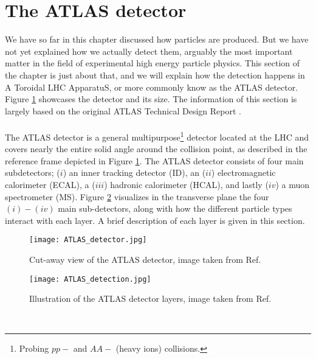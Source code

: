 \documentclass[12pt, a4paper]{book}
\begin{document}
\clearpage
\section{The ATLAS detector}\label{sec:ATLAS}
We have so far in this chapter discussed how particles are produced. But we have not yet explained how we actually detect them, arguably the most important matter in the field of experimental high energy particle physics.
This section of the chapter is just about that, and we will explain how the detection happens in A Toroidal LHC ApparatuS, or more commonly know as the ATLAS detector. Figure \ref{fig:ATLAS_detector} showcases 
the detector and its size. The information of this section is largely based on the original ATLAS Technical Design Report \cite{Aad:1129811}.\\
\\The ATLAS detector is a general multipurpose\footnote{Probing $pp-$ and $AA-$ (heavy ions) collisions.} detector located at the LHC and covers nearly the entire solid angle 
around the collision point, as described in the reference frame depicted in Figure \ref{fig:ATLAS_detector}. The ATLAS detector consists of four main subdetectors; ($i$) an inner tracking detector (ID), 
an ($ii$) electromagnetic calorimeter (ECAL), a ($iii$) hadronic calorimeter (HCAL), and lastly ($iv$) a muon spectrometer (MS). Figure \ref{fig:ATLAS_layers} visualizes in the transverse plane the four $(i)-(iv)$ main sub-detectors, 
along with how the different particle types interact with each layer. A brief description of each layer is given in this section.
\begin{figure}[!ht]
	\centering
    \texttt{[image: ATLAS\_detector.jpg]}
    \caption[The ATLAS detector]{Cut-away view of the ATLAS detector, image taken from Ref. \cite{Aad:1129811}}\label{fig:ATLAS_detector}
\end{figure}
\begin{figure}[!ht]
	\centering
    \texttt{[image: ATLAS\_detection.jpg]}
    \caption[Illustration of the ATLAS detector layers]{Illustration of the ATLAS detector layers, image taken from Ref. \cite{Pequenao:1505342}}\label{fig:ATLAS_layers}
\end{figure}
\\
\end{document}
